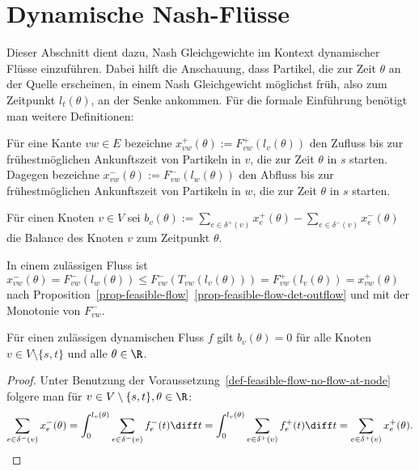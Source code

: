 \section{Dynamische Nash-Flüsse}\label{sec-nash-flows}

Dieser Abschnitt dient dazu, Nash Gleichgewichte im Kontext dynamischer Flüsse einzuführen.
Dabei hilft die Anschauung, dass Partikel, die zur Zeit $\theta$ an der Quelle erscheinen, in einem Nash Gleichgewicht möglichst früh, also zum Zeitpunkt $l_t(\theta)$, an der Senke ankommen.
Für die formale Einführung benötigt man weitere Definitionen: 

\begin{definition}
	Für eine Kante $vw\in E$ bezeichne $x_{vw}^+(\theta):= F_{vw}^+(l_v(\theta))$ den Zufluss bis zur frühestmöglichen Ankunftszeit von Partikeln in $v$, die zur Zeit $\theta$ in $s$ starten.\\
	Dagegen bezeichne $x_{vw}^-(\theta):= F^-_{vw}(l_w(\theta))$ den Abfluss bis zur frühestmöglichen Ankunftszeit von Partikeln in $w$, die zur Zeit $\theta$ in $s$ starten.
	
	Für einen Knoten $v\in V$ sei $b_v(\theta):=\sum_{e\in\delta^+(v)} x_e^+(\theta) - \sum_{e\in\delta^-(v)} x_e^-(\theta)$ die Balance des Knoten $v$ zum Zeitpunkt $\theta$.
\end{definition}

\begin{remark}\label{remark-x^-leqx^+}
	In einem zulässigen Fluss ist $x_{vw}^-(\theta) = F_{vw}^-(l_w(\theta)) \leq F_{vw}^-(T_{vw}(l_v(\theta)))=F_{vw}^+(l_v(\theta)) = x_{vw}^+(\theta)$
	nach Proposition~\ref{prop-feasible-flow}~\ref{prop-feasible-flow-det-outflow} und mit der Monotonie von $F_{vw}^-$.
\end{remark}

\begin{lemma}\label{lemma-balance-0}
	Für einen zulässigen dynamischen Fluss $f$ gilt $b_v(\theta)=0$ für alle Knoten $v\in V\setminus\{ s,t \}$ und alle $\theta\in\R$.
\end{lemma}
\begin{proof}
	Unter Benutzung der Voraussetzung~\ref{def-feasible-flow-no-flow-at-node} folgere man für $v\in V\setminus \{ s, t\}, \theta\in\R$:
	\[ \sum_{e\in\delta^-(v)} x_e^-(\theta) = \int_{0}^{l_v(\theta)} \sum_{e\in\delta^-(v)} f_e^-(t) \diff t = \int_{0}^{l_v(\theta)} \sum_{e\in\delta^+(v)} f_e^+(t) \diff t = \sum_{e\in\delta^+(v)}x_e^+(\theta). \]
\vspace{-1.4 \baselineskip}

\end{proof}

